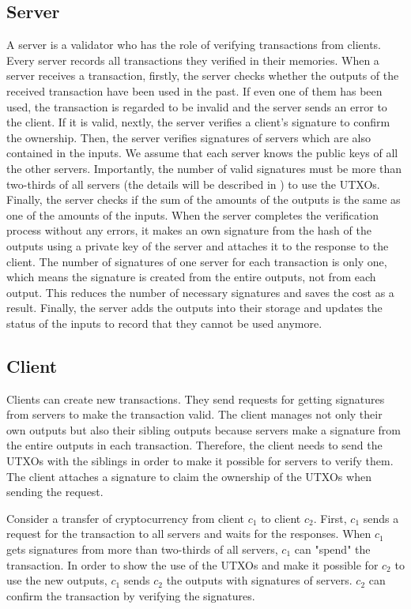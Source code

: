 \documentclass[a4paper, oneside]{discothesis}
\begin{document}
\subsection{Server}
A server is a validator who has the role of verifying transactions from clients.
Every server records all transactions they verified in their memories.
When a server receives a transaction, firstly, the server checks
whether the outputs of the received transaction have been used in the past.
If even one of them has been used, the transaction is regarded to be invalid
and the server sends an error to the client.
If it is valid, nextly, the server verifies a client's signature to confirm the ownership.
Then, the server verifies signatures of servers which are also contained in the inputs.
We assume that each server knows the public keys of all the other servers.
Importantly, the number of valid signatures must be more than two-thirds of all servers
(the details will be described in ) to use the UTXOs. %
Finally, the server checks if the sum of the amounts of the outputs is the same
as one of the amounts of the inputs.
When the server completes the verification process without any errors,
it makes an own signature from the hash of the outputs using a private key of the server
and attaches it to the response to the client.
The number of signatures of one server for each transaction is only one,
which means the signature is created from the entire outputs, not from each output.
This reduces the number of necessary signatures and saves the cost as a result.
Finally, the server adds the outputs into their storage
and updates the status of the inputs to record that they cannot be used anymore.


\subsection{Client}
Clients can create new transactions.
They send requests for getting signatures from servers to make the transaction valid.
The client manages not only their own outputs but also their sibling outputs
because servers make a signature from the entire outputs in each transaction.
Therefore, the client needs to send the UTXOs with the siblings
in order to make it possible for servers to verify them.
The client attaches a signature to claim the ownership of the UTXOs when sending the request.

Consider a transfer of cryptocurrency from client $c_1$ to client $c_2$.
First, $c_1$ sends a request for the transaction to all servers and waits for the responses.
When $c_1$ gets signatures from more than two-thirds of all servers,
$c_1$ can "spend" the transaction.
In order to show the use of the UTXOs and make it possible for $c_2$ to use the new outputs,
$c_1$ sends $c_2$ the outputs with signatures of servers.
$c_2$ can confirm the transaction by verifying the signatures.
\end{document}

